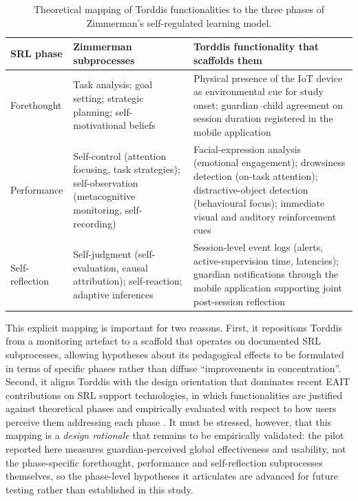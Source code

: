 \begin{table}[!htbp]
	\centering
	\caption{Theoretical mapping of Torddis functionalities to the three phases of Zimmerman's self-regulated learning model.}
	\label{tab:srl-mapping}
	\setlength{\tabcolsep}{5pt}
	\begin{tabular}{
			>{\raggedright\arraybackslash}p{2.0cm}
			>{\raggedright\arraybackslash}p{4.0cm}
			>{\raggedright\arraybackslash}p{6.0cm}
		}
		\toprule
		\textbf{SRL phase} & \textbf{Zimmerman subprocesses} & \textbf{Torddis functionality that scaffolds them} \\
		\midrule
		Forethought & Task analysis; goal setting; strategic planning; self-motivational beliefs & Physical presence of the IoT device as environmental cue for study onset; guardian--child agreement on session duration registered in the mobile application \\
		Performance & Self-control (attention focusing, task strategies); self-observation (metacognitive monitoring, self-recording) & Facial-expression analysis (emotional engagement); drowsiness detection (on-task attention); distractive-object detection (behavioural focus); immediate visual and auditory reinforcement cues \\
		Self-reflection & Self-judgment (self-evaluation, causal attribution); self-reaction; adaptive inferences & Session-level event logs (alerts, active-supervision time, latencies); guardian notifications through the mobile application supporting joint post-session reflection \\
		\bottomrule
	\end{tabular}
\end{table}

This explicit mapping is important for two reasons. First, it repositions Torddis from a monitoring artefact to a scaffold that operates on documented SRL subprocesses, allowing hypotheses about its pedagogical effects to be formulated in terms of specific phases rather than diffuse ``improvements in concentration''. Second, it aligns Torddis with the design orientation that dominates recent EAIT contributions on SRL support technologies, in which functionalities are justified against theoretical phases and empirically evaluated with respect to how users perceive them addressing each phase \citep{Amaefule2025Childrens, Kleimola2025Promoting}. It must be stressed, however, that this mapping is a \emph{design rationale} that remains to be empirically validated: the pilot reported here measures guardian-perceived global effectiveness and usability, not the phase-specific forethought, performance and self-reflection subprocesses themselves, so the phase-level hypotheses it articulates are advanced for future testing rather than established in this study.


